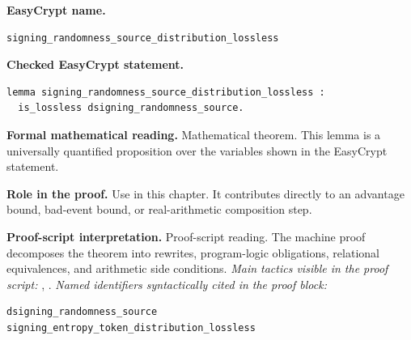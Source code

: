 \begin{formaltheorem}
\noindent\textbf{EasyCrypt name.}
\begin{lstlisting}[language=EasyCrypt,basicstyle=\ttfamily\scriptsize]
signing_randomness_source_distribution_lossless
\end{lstlisting}
\noindent\textbf{Checked EasyCrypt statement.}
\begin{lstlisting}[language=EasyCrypt,basicstyle=\ttfamily\scriptsize]
lemma signing_randomness_source_distribution_lossless :
  is_lossless dsigning_randomness_source.
\end{lstlisting}
\noindent\textbf{Formal mathematical reading.}
Mathematical theorem. This lemma is a universally quantified proposition over the variables shown in the EasyCrypt statement.

\noindent\textbf{Role in the proof.}
Use in this chapter. It contributes directly to an advantage bound, bad-event bound, or real-arithmetic composition step.

\noindent\textbf{Proof-script interpretation.}
Proof-script reading. The machine proof decomposes the theorem into rewrites, program-logic obligations, relational equivalences, and arithmetic side conditions.
\emph{Main tactics visible in the proof script:} , .
\emph{Named identifiers syntactically cited in the proof block:}
\begin{lstlisting}[language=EasyCrypt,basicstyle=\ttfamily\scriptsize]
dsigning_randomness_source
signing_entropy_token_distribution_lossless
\end{lstlisting}

\end{formaltheorem}

